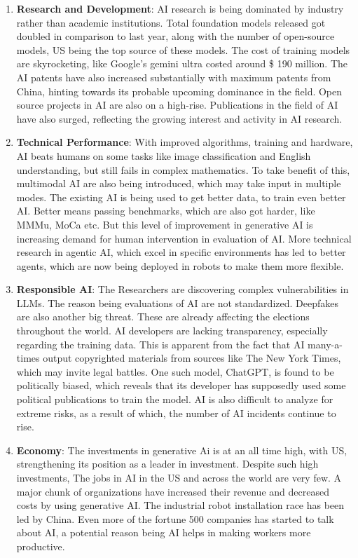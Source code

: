 \documentclass{article}
\begin{document}
\begin{enumerate}
  \item \textbf{Research and Development}: AI research is being dominated by industry rather than academic institutions. Total foundation models released got doubled in comparison to last year, along with the number of open-source models, US being the top source of these models. The cost of training models are skyrocketing, like Google’s gemini ultra costed around \$ 190 million. The AI patents have also increased substantially with maximum patents from China, hinting towards its probable upcoming dominance in the field. Open source projects in AI are also on a high-rise. Publications in the field of AI have also surged, reflecting the growing interest and activity in AI research.
  \item \textbf{Technical Performance}: With improved algorithms, training and hardware, AI beats humans on some tasks like image classification and English understanding, but still fails in complex mathematics. To take benefit of this, multimodal AI are also being introduced, which may take input in multiple modes. The existing AI is being used to get better data, to train even better AI. Better means passing benchmarks, which are also got harder, like MMMu, MoCa etc. But this level of improvement in generative AI is increasing demand for human intervention in evaluation of AI. More technical research in agentic AI, which excel in specific environments has led to better agents, which are now being deployed in robots to make them more flexible.
  \item \textbf{Responsible AI}: The Researchers are discovering  complex vulnerabilities in LLMs. The reason being evaluations of AI are not standardized. Deepfakes are also another big threat. These are already affecting the elections throughout the world. AI developers are lacking transparency, especially regarding the training data. This is apparent from the fact that AI many-a-times output copyrighted materials from sources like The New York Times, which may invite legal battles. One such model, ChatGPT, is found to be politically biased, which reveals that its developer has supposedly used some political publications to train the model. AI is also difficult to analyze for extreme risks, as a result of which, the number of AI incidents continue to rise. 
  \item \textbf{Economy}: The investments in generative Ai is at an all time high, with US, strengthening its position as a leader in investment. Despite such high investments, The jobs in AI in the US and across the world are very few. A major chunk of organizations have increased their revenue and decreased costs by using generative AI. The industrial robot installation race has been led by China. Even more of the fortune 500 companies has started to talk about AI, a potential reason being AI helps in making workers more productive.

\end{enumerate}
\end{document}
